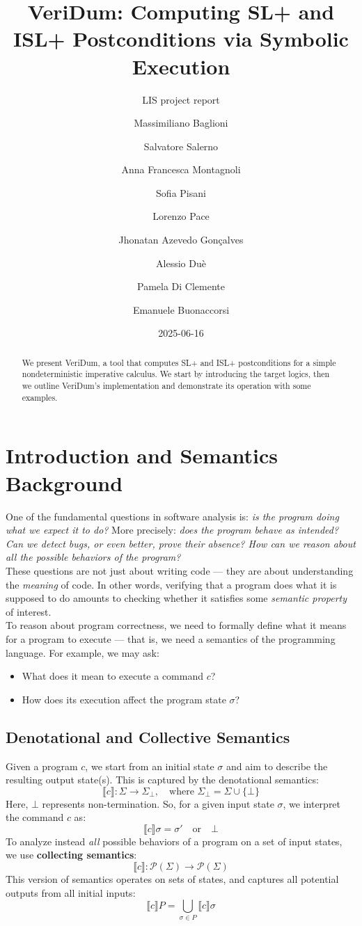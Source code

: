 \documentclass[parskip=half]{scrartcl}
\title{VeriDum: Computing SL+ and ISL+ Postconditions via Symbolic Execution}
\subtitle{LIS project report}
\date{2025-06-16}
\author{ %
  Massimiliano Baglioni      \and
  Salvatore Salerno          \and
  Anna Francesca Montagnoli  \and
  Sofia Pisani               \and
  Lorenzo Pace               \and
  Jhonatan Azevedo Gonçalves \and
  Alessio Duè                \and
  Pamela Di Clemente         \and
  Emanuele Buonaccorsi}
\begin{document}
\maketitle

\begin{abstract}
  We present VeriDum, a tool that computes SL+ and ISL+ postconditions for a simple nondeterministic imperative calculus. We start by introducing the target logics, then we outline VeriDum's implementation and demonstrate its operation with some examples.
\end{abstract}

\section{Introduction and Semantics Background}

One of the fundamental questions in software analysis is: \emph{is the program doing what we expect it to do?} More precisely: \emph{does the program behave as intended? Can we detect bugs, or even better, prove their absence? How can we reason about all the possible behaviors of the program?}
\\ These questions are not just about writing code — they are about understanding the \emph{meaning} of code. In other words, verifying that a program does what it is supposed to do amounts to checking whether it satisfies some \emph{semantic property} of interest.
\\ To reason about program correctness, we need to formally define what it means for a program to execute — that is, we need a semantics of the programming language. For example, we may ask:
\begin{itemize}
    \item What does it mean to execute a command \( c \)?
    \item How does its execution affect the program state \( \sigma \)?
\end{itemize}

\subsection{Denotational and Collective Semantics}
Given a program \( c \), we start from an initial state \( \sigma \) and aim to describe the resulting output state(s). This is captured by the denotational semantics:
\[
\llbracket c \rrbracket : \Sigma \rightarrow \Sigma_{\bot}, \quad \text{where } \Sigma_{\bot} = \Sigma \cup \{ \bot \}
\]
Here, \( \bot \) represents non-termination. So, for a given input state \( \sigma \), we interpret the command \( c \) as:
\[
\llbracket c \rrbracket \sigma = \sigma' \quad \text{or} \quad \bot
\]
To analyze instead \emph{all} possible behaviors of a program on a set of input states, we use \textbf{collecting semantics}:
\[
\llbracket c \rrbracket : \mathcal{P}(\Sigma) \rightarrow \mathcal{P}(\Sigma)
\]
This version of semantics operates on sets of states, and captures all potential outputs from all initial inputs:
\[
\llbracket c \rrbracket P = \bigcup_{\sigma \in P} \llbracket c \rrbracket \sigma
\]
\end{document}
